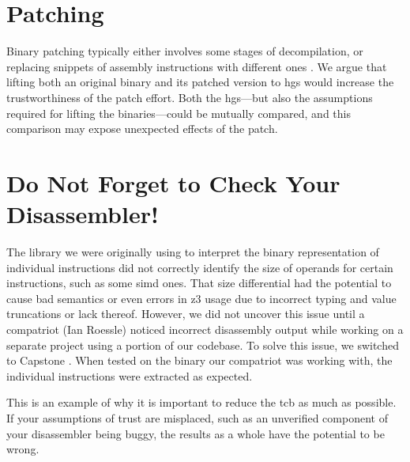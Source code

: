 \section{Patching}
Binary patching typically either involves some stages of decompilation, or replacing snippets of assembly instructions with different ones \autocite{duck2020binary}.
We argue that lifting both an original binary and its patched version to \glspl{hg} would increase the trustworthiness of the patch effort.
Both the \glspl{hg}---but also the assumptions required for lifting the binaries---could be mutually compared, and this comparison may expose unexpected effects of the patch.

\section{Do Not Forget to Check Your Disassembler!}
The library we were originally using to interpret the binary representation of individual instructions did not correctly identify the size of operands for certain instructions, such as some \gls{simd} ones.
That size differential had the potential to cause bad semantics or even errors in \gls{z3} usage due to incorrect typing and value truncations or lack thereof.
However, we did not uncover this issue until a compatriot (Ian Roessle) noticed incorrect disassembly output while working on a separate project using a portion of our codebase.
To solve this issue, we switched to Capstone \autocite{capstone}.
When tested on the binary our compatriot was working with, the individual instructions were extracted as expected.

This is an example of why it is important to reduce the \gls{tcb} as much as possible.
If your assumptions of trust are misplaced, such as an unverified component of your disassembler being buggy, the results as a whole have the potential to be wrong.
